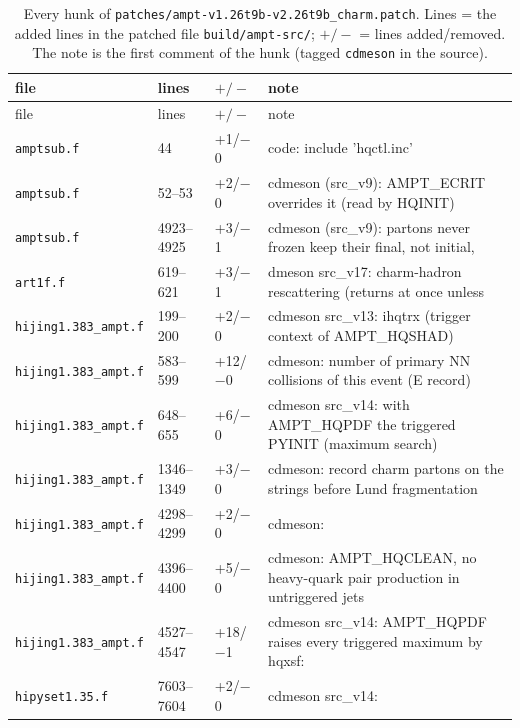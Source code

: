 {\small\begin{longtable}{@{}p{2.7cm}p{1.5cm}p{1.3cm}p{9.4cm}@{}}
\caption{Every hunk of \texttt{patches/ampt-v1.26t9b-v2.26t9b\_charm.patch}. Lines = the added lines in the patched file \texttt{build/ampt-src/}; $+/-$ = lines added/removed. The note is the first comment of the hunk (tagged \texttt{cdmeson} in the source).}\label{tab:hunks}\\
\toprule file & lines & $+/-$ & note \\ \midrule \endfirsthead
\toprule file & lines & $+/-$ & note \\ \midrule \endhead
\texttt{amptsub.f} & 44 & +1/$-$0 & code: include 'hqctl.inc' \\
\texttt{amptsub.f} & 52--53 & +2/$-$0 & cdmeson (src\_\allowbreak{}v9): AMPT\_\allowbreak{}ECRIT overrides it (read by HQINIT) \\
\texttt{amptsub.f} & 4923--4925 & +3/$-$1 & cdmeson (src\_\allowbreak{}v9): partons never frozen keep their final, not initial, \\
\texttt{art1f.f} & 619--621 & +3/$-$1 & dmeson src\_\allowbreak{}v17: charm-hadron rescattering (returns at once unless \\
\texttt{hijing1.383\_\allowbreak{}ampt.f} & 199--200 & +2/$-$0 & cdmeson src\_\allowbreak{}v13: ihqtrx (trigger context of AMPT\_\allowbreak{}HQSHAD) \\
\texttt{hijing1.383\_\allowbreak{}ampt.f} & 583--599 & +12/$-$0 & cdmeson: number of primary NN collisions of this event (E record) \\
\texttt{hijing1.383\_\allowbreak{}ampt.f} & 648--655 & +6/$-$0 & cdmeson src\_\allowbreak{}v14: with AMPT\_\allowbreak{}HQPDF the triggered PYINIT (maximum search) \\
\texttt{hijing1.383\_\allowbreak{}ampt.f} & 1346--1349 & +3/$-$0 & cdmeson: record charm partons on the strings before Lund fragmentation \\
\texttt{hijing1.383\_\allowbreak{}ampt.f} & 4298--4299 & +2/$-$0 & cdmeson: \\
\texttt{hijing1.383\_\allowbreak{}ampt.f} & 4396--4400 & +5/$-$0 & cdmeson: AMPT\_\allowbreak{}HQCLEAN, no heavy-quark pair production in untriggered jets \\
\texttt{hijing1.383\_\allowbreak{}ampt.f} & 4527--4547 & +18/$-$1 & cdmeson src\_\allowbreak{}v14: AMPT\_\allowbreak{}HQPDF raises every triggered maximum by hqxsf: \\
\texttt{hipyset1.35.f} & 7603--7604 & +2/$-$0 & cdmeson src\_\allowbreak{}v14: \\

\end{longtable}}
